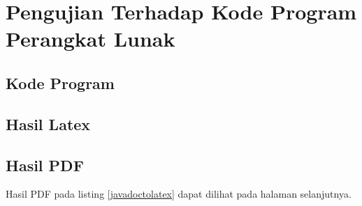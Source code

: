 \chapter{Pengujian Terhadap Kode Program Perangkat Lunak}
\label{lamp:B}
\section{Kode Program}




\section{Hasil Latex}

\section{Hasil PDF}
Hasil PDF pada listing \ref{javadoctolatex} dapat dilihat pada halaman selanjutnya.




%
%



